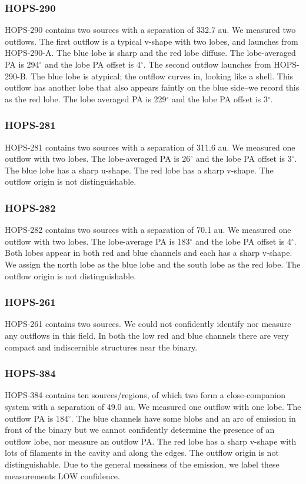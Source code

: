 \documentclass[linenumbers,twocolumn, twocolappendix]{aastex631}
\begin{document}
\subsubsection{HOPS-290}
HOPS-290 contains two sources with a separation of 332.7 au. We measured two outflows. The first outflow is a typical v-shape with two lobes, and launches from HOPS-290-A. The blue lobe is sharp and the red lobe diffuse. The lobe-averaged PA is 294$^\circ$ and the lobe PA offset is 4$^\circ$. The second outflow launches from HOPS-290-B. The blue lobe is atypical; the outflow curves in, looking like a shell. This outflow has another lobe that also appears faintly on the blue side--we record this as the red lobe. The lobe averaged PA is 229$^\circ$ and the lobe PA offset is 3$^\circ$.

\subsubsection{HOPS-281}
HOPS-281 contains two sources with a separation of 311.6 au. We measured one outflow with two lobes. The lobe-averaged PA is 26$^\circ$ and the lobe PA offset is 3$^\circ$. The blue lobe has a sharp u-shape. The red lobe has a sharp v-shape. The outflow origin is not distinguishable.

\subsubsection{HOPS-282}
HOPS-282 contains two sources with a separation of 70.1 au. We measured one outflow with two lobes. The lobe-average PA is 183$^\circ$ and the lobe PA offset is 4$^\circ$. Both lobes appear in both red and blue channels and each has a sharp v-shape. We assign the north lobe as the blue lobe and the south lobe as the red lobe. The outflow origin is not distinguishable.

\subsubsection{HOPS-261}
HOPS-261 contains two sources. We could not confidently identify nor measure any outflows in this field. In both the low red and blue channels there are very compact and indiscernible structures near the binary.

\subsubsection{HOPS-384}
HOPS-384 contains ten sources/regions, of which two form a close-companion system with a separation of 49.0 au. We measured one outflow with one lobe. The outflow PA is 184$^\circ$. The blue channels have some blobs and an arc of emission in front of the binary but we cannot confidently determine the presence of an outflow lobe, nor measure an outflow PA. The red lobe has a sharp v-shape with lots of filaments in the cavity and along the edges. The outflow origin is not distinguishable. Due to the general messiness of the emission, we label these measurements LOW confidence.
\end{document}
